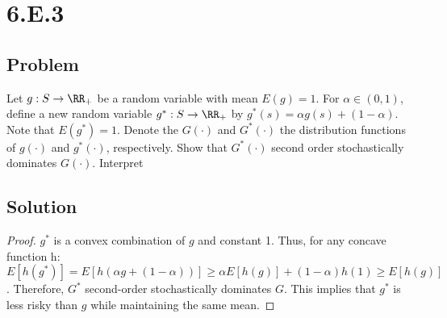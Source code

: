 \documentclass[10pt, a4paper]{article}
\begin{document}
  \section*{6.E.3}
    \subsection*{Problem}
      Let $g: S\rightarrow \RR_+$ be a random variable with mean $E(g) = 1$. For $\alpha\in(0,1)$, define a new random variable $g^*: S\rightarrow \RR_+$ by $g^*(s) = \alpha g(s) + (1-\alpha)$. Note that $E(g^*)=1$. Denote the $G(\cdot)$ and $G^*(\cdot)$ the distribution functions of $g(\cdot)$ and $g^*(\cdot)$, respectively. Show that $G^*(\cdot)$ second order stochastically dominates $G(\cdot)$. Interpret  
    \subsection*{Solution}
      \begin{proof}
        $g^*$ is a convex combination of $g$ and constant 1. Thus, for any concave function h: $E[h(g^*)] = E[h(\alpha g+(1-\alpha))]\geq\alpha E[h(g)]+(1-\alpha)h(1)\geq E[h(g)]$. Therefore, $G^*$ second-order stochastically dominates $G$. This implies that $g^*$ is less risky than $g$ while maintaining the same mean. 
      \end{proof}
\end{document}
